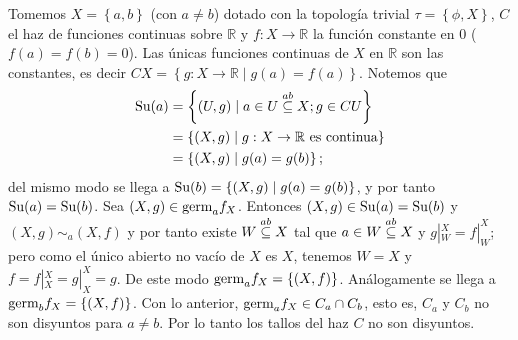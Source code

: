\begin{Ejm}
   Tomemos $X=\left\lbrace a,b\right\rbrace$ (con $a\neq b$) dotado con la topología trivial $\tau=\left\lbrace \phi,X\right\rbrace$, $C$ el haz de funciones continuas sobre $\mathbb{R}$ y $f:X\to \mathbb{R}$ la función constante en $0$ ($f(a)=f(b)=0$). Las únicas funciones continuas de $X$ en $\mathbb{R}$ son las constantes, es decir $CX=\left\lbrace g:X\to\mathbb{R}\mid g(a)=f(a)\right\rbrace$. Notemos que
   $$
   \begin{aligned}
      \normalfont{\text{Su}}(a)&=\left\lbrace (U,g)\mid a\in U\stackrel{ab}{\subseteq} X;g\in CU\right\rbrace\\
            &=\left\lbrace (X,g)\mid g:X\to\mathbb{R} \text{ es continua}\right\rbrace\\
            &=\left\lbrace (X,g)\mid g(a)=g(b)\right\rbrace;\\
   \end{aligned}
   $$
   del mismo modo se llega a $\normalfont{\text{Su}}(b)=\left\lbrace (X,g)\mid g(a)=g(b)\right\rbrace$, y por tanto $\normalfont{\text{Su}}(a)=\normalfont{\text{Su}}(b)$. Sea $(X,g)\in\normalfont{\text{germ}}_{a}f_{X}$. Entonces $(X,g)\in\normalfont{\text{Su}}(a)=\normalfont{\text{Su}}(b)$ y $(X,g)\sim_{a}(X,f)$ y por tanto existe $W\stackrel{ab}{\subseteq} X$ tal que $a\in W\stackrel{ab}{\subseteq} X$ y $g|^{X}_{W}=f|^{X}_{W}$; pero como el único abierto no vacío de $X$ es $X$, tenemos $W=X$ y $f=f|^{X}_{X}=g|^{X}_{X}=g$. De este modo $\normalfont{\text{germ}}_{a}f_{X}=\left\lbrace (X,f)\right\rbrace$. Análogamente se llega a $\normalfont{\text{germ}}_{b}f_{X}=\left\lbrace (X,f)\right\rbrace$. Con lo anterior, $\normalfont{\text{germ}}_{a}f_{X}\in C_{a}\cap C_{b}$, esto es, $C_a$ y $C_b$ no son disyuntos para $a\neq b$. Por lo tanto los tallos del haz $C$ no son disyuntos.
\end{Ejm}
